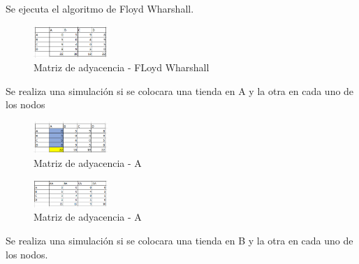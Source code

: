 \documentclass[conference,compsoc]{IEEEtran}
\begin{document}
Se ejecuta el algoritmo de Floyd Wharshall. 
\begin{figure}[h]
    \centering
    \includegraphics[width=0.25\textwidth]{Problema1/p18.png}
    \caption{Matriz de adyacencia - FLoyd Wharshall}
    \label{fig:mesh1}
\end{figure}

Se realiza una simulación si se colocara una tienda en A y la otra en cada uno de los nodos
\begin{figure}[h]
    \centering
    \includegraphics[width=0.25\textwidth]{Problema1/p19.png}
    \caption{Matriz de adyacencia - A}
    \label{fig:mesh1}
\end{figure}
\begin{figure}[h]
    \centering
    \includegraphics[width=0.25\textwidth]{Problema1/p110.png}
    \caption{Matriz de adyacencia - A}
    \label{fig:mesh1}
\end{figure}
$$$$
Se realiza una simulación si se colocara una tienda en B y la otra en cada uno de los nodos.
$$$$$$$$
\end{document}
